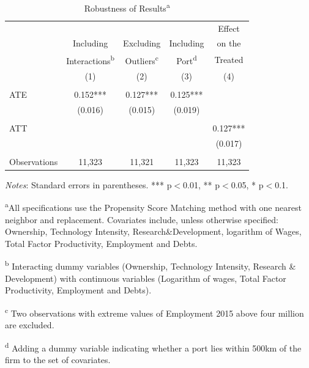 \documentclass[a4paper,11pt]{scrartcl}
\begin{document}
\begin{table}[h]
  \centering
   \caption{Robustness of Results\textsuperscript{a}}
   \label{tab:robust}
\begin{threeparttable}
 
\begin{tabular}{lcccc} 
	\hline 
	\hline
 		& & & & Effect \\
 		& Including & Excluding & Including & on the\\
 		& Interactions\textsuperscript{b} & Outliers\textsuperscript{c} 
 		& Port\textsuperscript{d} & Treated \\
 		& (1) & (2) & (3) & (4) \\ 
 	\hline
 		&  &  &  &  \\
ATE 	& 0.152*** & 0.127*** & 0.125*** &  \\
 		& (0.016) & (0.015) & (0.019) &  \\
 		&  &  &  &  \\
ATT 	&  &  &  & 0.127*** \\
 		&  &  &  & (0.017) \\
 		&  &  &  &  \\
Observations & 11,323 & 11,321 & 11,323 & 11,323 \\ 
	\hline
	\hline
\end{tabular}

\begin{tablenotes}[flushleft]
     \footnotesize
\item \textit{Notes}: Standard errors in parentheses. *** p$<$0.01, ** p$<$0.05, * p$<$0.1.    
     
\item \textsuperscript{a}All specifications use the Propensity Score Matching method with one nearest neighbor and replacement. Covariates include, unless otherwise specified: Ownership, Technology Intensity, Research\&Development, logarithm of Wages, Total Factor Productivity, Employment and Debts. 

\item\textsuperscript{b} Interacting dummy variables (Ownership, Technology Intensity, Research \& Development) with continuous variables (Logarithm of wages, Total Factor Productivity, Employment and Debts).  

\item\textsuperscript{c} Two observations with extreme values of Employment 2015 above four million are excluded.
 
\item\textsuperscript{d} Adding a dummy variable indicating whether a port lies within 500km of the firm to the set of covariates.
\end{tablenotes}

\end{threeparttable}
\end{table}
\end{document}
